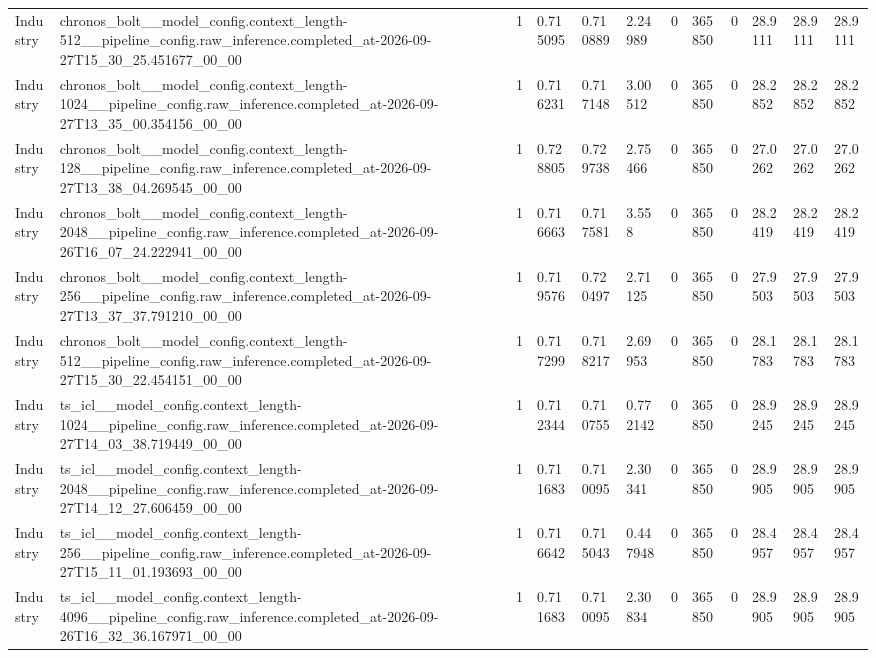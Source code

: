 \begin{tabular}{llllllllllll}
Industry & chronos\_bolt\_\_model\_config.context\_length-512\_\_pipeline\_config.raw\_inference.completed\_at-2026-09-27T15\_30\_25.451677\_00\_00 & 1 & 0.715095 & 0.710889 & 2.24989 & 0 & 365850 & 0 & 28.9111 & 28.9111 & 28.9111 \\
Industry & chronos\_bolt\_\_model\_config.context\_length-1024\_\_pipeline\_config.raw\_inference.completed\_at-2026-09-27T13\_35\_00.354156\_00\_00 & 1 & 0.716231 & 0.717148 & 3.00512 & 0 & 365850 & 0 & 28.2852 & 28.2852 & 28.2852 \\
Industry & chronos\_bolt\_\_model\_config.context\_length-128\_\_pipeline\_config.raw\_inference.completed\_at-2026-09-27T13\_38\_04.269545\_00\_00 & 1 & 0.728805 & 0.729738 & 2.75466 & 0 & 365850 & 0 & 27.0262 & 27.0262 & 27.0262 \\
Industry & chronos\_bolt\_\_model\_config.context\_length-2048\_\_pipeline\_config.raw\_inference.completed\_at-2026-09-26T16\_07\_24.222941\_00\_00 & 1 & 0.716663 & 0.717581 & 3.558 & 0 & 365850 & 0 & 28.2419 & 28.2419 & 28.2419 \\
Industry & chronos\_bolt\_\_model\_config.context\_length-256\_\_pipeline\_config.raw\_inference.completed\_at-2026-09-27T13\_37\_37.791210\_00\_00 & 1 & 0.719576 & 0.720497 & 2.71125 & 0 & 365850 & 0 & 27.9503 & 27.9503 & 27.9503 \\
Industry & chronos\_bolt\_\_model\_config.context\_length-512\_\_pipeline\_config.raw\_inference.completed\_at-2026-09-27T15\_30\_22.454151\_00\_00 & 1 & 0.717299 & 0.718217 & 2.69953 & 0 & 365850 & 0 & 28.1783 & 28.1783 & 28.1783 \\
Industry & ts\_icl\_\_model\_config.context\_length-1024\_\_pipeline\_config.raw\_inference.completed\_at-2026-09-27T14\_03\_38.719449\_00\_00 & 1 & 0.712344 & 0.710755 & 0.772142 & 0 & 365850 & 0 & 28.9245 & 28.9245 & 28.9245 \\
Industry & ts\_icl\_\_model\_config.context\_length-2048\_\_pipeline\_config.raw\_inference.completed\_at-2026-09-27T14\_12\_27.606459\_00\_00 & 1 & 0.711683 & 0.710095 & 2.30341 & 0 & 365850 & 0 & 28.9905 & 28.9905 & 28.9905 \\
Industry & ts\_icl\_\_model\_config.context\_length-256\_\_pipeline\_config.raw\_inference.completed\_at-2026-09-27T15\_11\_01.193693\_00\_00 & 1 & 0.716642 & 0.715043 & 0.447948 & 0 & 365850 & 0 & 28.4957 & 28.4957 & 28.4957 \\
Industry & ts\_icl\_\_model\_config.context\_length-4096\_\_pipeline\_config.raw\_inference.completed\_at-2026-09-26T16\_32\_36.167971\_00\_00 & 1 & 0.711683 & 0.710095 & 2.30834 & 0 & 365850 & 0 & 28.9905 & 28.9905 & 28.9905 \\

\end{tabular}
